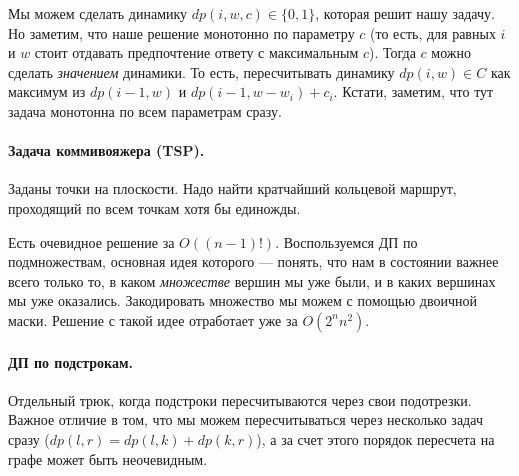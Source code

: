 \documentclass[12pt]{article}
\begin{document}
Мы можем сделать динамику $dp(i, w, c) \in \{0, 1\}$, которая решит нашу задачу. Но заметим, что наше решение монотонно по параметру $c$ (то есть, для равных $i$ и $w$ стоит отдавать предпочтение ответу с максимальным $c$). Тогда $c$ можно сделать \textit{значением} динамики. То есть, пересчитывать динамику $dp(i,w) \in C$ как максимум из $dp(i - 1, w)$ и $dp(i - 1, w - w_i) + c_i$. Кстати, заметим, что тут задача монотонна по всем параметрам сразу.

\paragraph{Задача коммивояжера (TSP).} Заданы точки на плоскости. Надо найти кратчайший кольцевой маршрут, проходящий по всем точкам хотя бы единожды.

Есть очевидное решение за $O((n-1)!)$. Воспользуемся ДП по подмножествам, основная идея которого --- понять, что нам в состоянии важнее всего только то, в каком \textit{множестве} вершин мы уже были, и в каких вершинах мы уже оказались. Закодировать множество мы можем с помощью двоичной маски. Решение с такой идее отработает уже за $O(2^nn^2)$.

\paragraph{ДП по подстрокам.} Отдельный трюк, когда подстроки пересчитываются через свои подотрезки. Важное отличие в том, что мы можем пересчитываться через несколько задач сразу ($dp(l, r) = dp(l, k) + dp(k, r)$), а за счет этого порядок пересчета на графе может быть неочевидным.
\end{document}
